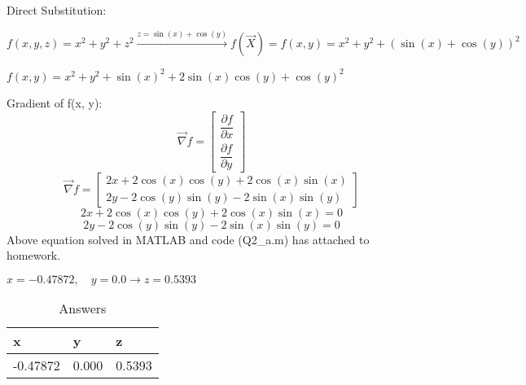 Direct Substitution:


$f(x, y, z) = x^2 + y^2 + z^ 2 \xrightarrow{z = \sin(x) + \cos(y)}
f(\vec{X}) = f(x, y) = x^2 + y^2 + (\sin(x)+\cos(y))^2
$


$f(x, y) = x^2 + y^2 + \sin(x)^2 + 2\sin(x)\cos(y) + \cos(y)^2$


Gradient of f(x, y):
$$\vec{\nabla} f = \begin{bmatrix}
	\dfrac{\partial f}{\partial x} \\[6pt]
	\dfrac{\partial f}{\partial y}
\end{bmatrix} $$
$$\vec{\nabla} f = \begin{bmatrix}
	2x + 2\cos(x)\cos(y) + 2\cos(x)\sin(x) \\
	2y - 2\cos(y)\sin(y) - 2\sin(x)\sin(y)
\end{bmatrix} $$
$$	2x + 2\cos(x)\cos(y) + 2\cos(x)\sin(x)=  0 $$
$$2y - 2\cos(y)\sin(y) - 2\sin(x)\sin(y)= 0$$
Above equation solved in MATLAB and code (Q2\_a.m) has attached to homework.


$x = -0.47872, \quad y = 0.0 \to z = 0.5393 $
\begin{table}[H]
	\caption {Answers} \label{ans} 
	\begin{center}
		\begin{tabular}{| l | l | l |}
			\hline
			x & y & z \TBstrut \\
			\hline
			-0.47872 & 0.000 & 0.5393 \Tstrut\\
			\hline
		\end{tabular}
	\end{center}
\end{table}

